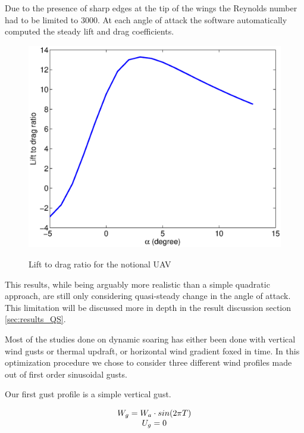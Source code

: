 Due to the presence of sharp edges at the tip of the wings the Reynolds number had to be limited to 3000.
At each angle of attack the software automatically computed the steady lift and drag coefficients.

\begin{figure}[ht]
  \begin{center}
    \scalebox{0.8}
    {\includegraphics{./Figures/lift_to_drag_UAV.eps}}
  \end{center}
  \caption{Lift to drag ratio for the notional UAV}
  \label{fig:lift_to_drag_UAV}
\end{figure}

\par This results, while being arguably more realistic than a simple quadratic approach, are still only considering quasi-steady change in the angle of attack.
This limitation will be discussed more in depth in the result discussion section \ref{sec:results_QS}.

Most of the studies done on dynamic soaring has either been done with vertical wind gusts or thermal updraft, or horizontal wind gradient foxed in time.
In this optimization procedure we chose to consider three different wind profiles made out of first order sinusoidal gusts.

\par Our first gust profile is a simple vertical gust.

\begin{equation}
  \begin{array}[c]{c}
    W_g = W_a \cdot sin(2\pi T) \\
    U_g = 0 
  \end{array}
  \label{eqn:vertical_gust_definition}
\end{equation}

